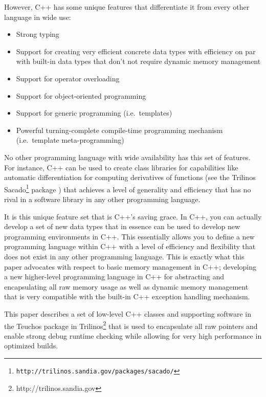 \documentclass[pdf,ps2pdf,11pt]{SANDreport}
\begin{document}
However, C++ has some unique features that differentiate it from every
other language in wide use:

\begin{itemize}

{}\item Strong typing

{}\item Support for creating very efficient concrete data types with
efficiency on par with built-in data types that don't not require
dynamic memory management

{}\item Support for operator overloading

{}\item Support for object-oriented programming

{}\item Support for generic programming (i.e.\ templates)

{}\item Powerful turning-complete compile-time programming mechanism
(i.e.\ template meta-programming)

\end{itemize}

No other programming language with wide availability has this set of
features.  For instance, C++ can be used to create class libraries for
capabilities like automatic differentiation {}\cite{ref:ad} for
computing derivatives of functions (see the Trilinos
Sacado\footnote{\texttt{http://trilinos.sandia.gov/packages/sacado/}}
package {}\cite{phippsEtAl2006}) that achieves a level of generality
and efficiency that has no rival in a software library in any other
programming language.

It is this unique feature set that is C++'s saving grace.  In C++, you
can actually develop a set of new data types that in essence can be
used to develop new programming environments in C++.  This essentially
allows you to define a new programming language within C++ with a
level of efficiency and flexibility that does not exist in any other
programming language.  This is exactly what this paper advocates
with respect to basic memory management in C++; developing a new
higher-level programming language in C++ for abstracting and
encapsulating all raw memory usage as well as dynamic memory
management that is very compatible with the built-in C++ exception
handling mechanism.

This paper describes a set of low-level C++ classes and supporting
software in the Teuchos package in
Trilinos\footnote{http://trilinos.sandia.gov} that is used to
encapsulate all raw pointers and enable strong debug runtime checking
while allowing for very high performance in optimized builds.
\end{document}
